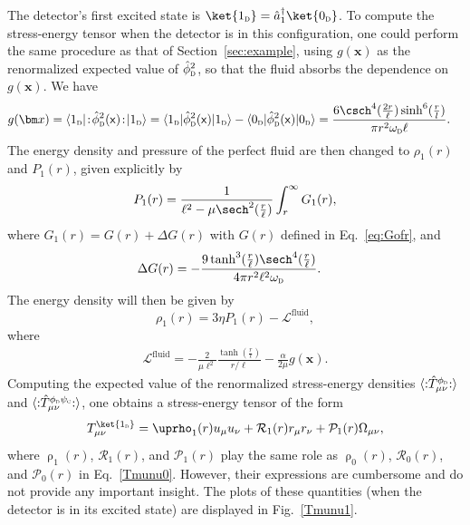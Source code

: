 \documentclass[letterpaper,12pt,titlepage,oneside,final]{book}
\newcommand{\normord}[1]{\vcentcolon\mathrel{#1}\vcentcolon}
\providecommand{\vcentcolon}{\mathrel{\mathop{:}}}
\newcommand{\mf}{\mathsf}%
\newcommand{\tc}[1]{\textsc{#1}}
\begin{document}
The detector's first excited state is \mbox{$\ket{1_\tc{d}} = \hat{a}_1^\dagger \ket{0_\tc{d}}$}. To compute the stress-energy tensor when the detector is in this configuration, one could perform the same procedure as that of Section~\ref{sec:example}, using $g(\bm x)$ as the renormalized expected value of $\hat{\phi}_\tc{d}^2$, so that the fluid absorbs the dependence on $g(\bm x)$. We have
\begin{align}
    g(\bm x) &= \langle 1_\tc{d} | \!:\!\hat{\phi}_\tc{d}^2(\mf x)\!:\!| 1_\tc{d} \rangle =\langle 1_\tc{d} | \hat{\phi}_\tc{d}^2(\mf x)| 1_\tc{d} \rangle - \langle 0_\tc{d} | \hat{\phi}_\tc{d}^2(\mf x)| 0_\tc{d} \rangle= \frac{6\csch^4(\tfrac{2r}{\ell})\sinh^6(\tfrac{r}{l})}{\pi r^2 \omega_\tc{d} \ell}.
\end{align}
The energy density and pressure of the perfect fluid are then changed to $\rho_1(r)$ and $P_1(r)$, given explicitly by
\begin{equation}
    P_1(r) = \frac{1}{\ell^2 - \mu \sech^2(\tfrac{r}{\ell})}\int_r^\infty G_1(r),
\end{equation}
where $G_1(r) = G(r) + \Delta G(r)$ with $G(r)$ defined in Eq.~\eqref{eq:Gofr}, and 
\begin{align}
    \Delta G(r) &= -\frac{9 \tanh^3(\tfrac{r}{\ell})\sech^4(\tfrac{r}{\ell})}{4 \pi r^2 \ell^2 \omega_\tc{d}}.
\end{align}
The energy density will then be given by
\begin{equation}
    \rho_1(r) = 3 \eta P_1(r) - \mathcal{L}^{\text{fluid}},
\end{equation}
where
\begin{align}
    \mathcal{L}^\text{fluid} =-\frac{2}{\mu\ell^2} \frac{\tanh(\tfrac{r}{\ell})}{r/\ell} - \frac{\alpha}{2\mu}g(\bm x).
\end{align}
Computing the expected value of the renormalized stress-energy densities $\langle\normord{\hat{T}_{\mu\nu}^{\phi_\tc{d}}}\rangle$ and $\langle\normord{\hat{T}_{\mu\nu}^{\phi_\tc{d}\psi_\tc{c}}}\rangle$, one obtains a stress-energy tensor of the form
\begin{equation}
    T^{\ket{1_\tc{d}}}_{\mu\nu} = \uprho_1(r)u_\mu u_\nu + \mathcal{R}_1(r)r_\mu r_\nu + \mathcal{P}_1(r) \Omega_{\mu\nu},
\end{equation}
where $\uprho_1(r)$, $\mathcal{R}_1(r)$, and $\mathcal{P}_1(r)$ play the same role as $\uprho_0(r)$, $\mathcal{R}_0(r)$, and $\mathcal{P}_0(r)$ in Eq.~\eqref{Tmunu0}. However, their expressions are cumbersome and do not provide any important insight. The plots of these quantities (when the detector is in its excited state) are displayed in Fig.~\ref{Tmunu1}.
\end{document}

